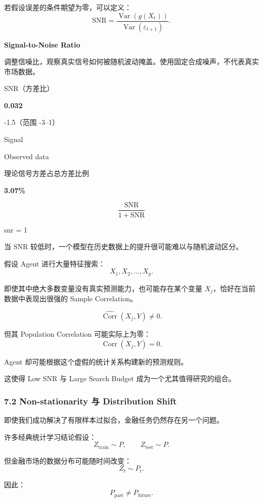 若假设误差的条件期望为零，可以定义：
\[\mathrm{SNR}
=
\frac{\operatorname{Var}(g(X_t))}
{\operatorname{Var}(\varepsilon_{t+1})}.\]

\textbf{Signal-to-Noise Ratio}

调整信噪比，观察真实信号如何被随机波动掩盖。使用固定合成噪声，不代表真实市场数据。

SNR（方差比）

\textbf{0.032}

-1.5（范围 -3--1）


Signal

Observed data

理论信号方差占总方差比例

\textbf{3.07\%}

\[\frac{\mathrm{SNR}}{1+\mathrm{SNR}}\]

snr = 1


当 SNR 较低时，一个模型在历史数据上的提升很可能难以与随机波动区分。

假设 Agent 进行大量特征搜索：
\[X_1,X_2,\ldots,X_p.\]

即使其中绝大多数变量没有真实预测能力，也可能存在某个变量 \(X_j\)，恰好在当前数据中表现出很强的 Sample Correlation。

\[\widehat{\operatorname{Corr}}(X_j,Y)
\neq0.\]

但其 Population Correlation 可能实际上为零：
\[\operatorname{Corr}(X_j,Y)=0.\]

Agent 却可能根据这个虚假的统计关系构建新的预测规则。

这使得 Low SNR 与 Large Search Budget 成为一个尤其值得研究的组合。

\hypertarget{part-1-07-0001-non-stationarity-ux4e0e-distribution-shift}{%
\subsubsection{7.2 Non-stationarity 与 Distribution Shift}\label{part-1-07-0001-non-stationarity-ux4e0e-distribution-shift}}

即使我们成功解决了有限样本过拟合，金融任务仍然存在另一个问题。

许多经典统计学习结论假设：
\[Z_{\mathrm{train}}\sim P,
\qquad
Z_{\mathrm{test}}\sim P.\]

但金融市场的数据分布可能随时间改变：
\[Z_t\sim P_t.\]

因此：
\[P_{\mathrm{past}}\neq P_{\mathrm{future}}.\]

